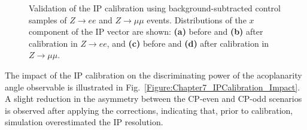 \begin{figure}[!htbp]
\begin{subfigure}[b]{0.49\textwidth}
            \caption{}
        \end{subfigure}
    \caption[Validation of the IP calibration in $Z\to ee$ and $Z\to\mu\mu$ events.]
    {Validation of the \ac{IP} calibration using background-subtracted control samples of $Z\to ee$ and $Z\to\mu\mu$ events. 
    Distributions of the $x$ component of the IP vector are shown: \textbf{(a)} before and \textbf{(b)} after calibration in $Z\to ee$, 
    and \textbf{(c)} before and \textbf{(d)} after calibration in $Z\to\mu\mu$. }

    \label{Figure:IPvector_Corrections}
\end{figure}

The impact of the \ac{IP} calibration on the discriminating power of the acoplanarity angle observable is illustrated in Fig.~\ref{Figure:Chapter7_IPCalibration_Impact}. A slight reduction in the asymmetry between the CP-even and CP-odd scenarios is observed after applying the corrections, indicating that, prior to calibration, simulation overestimated the IP resolution.


